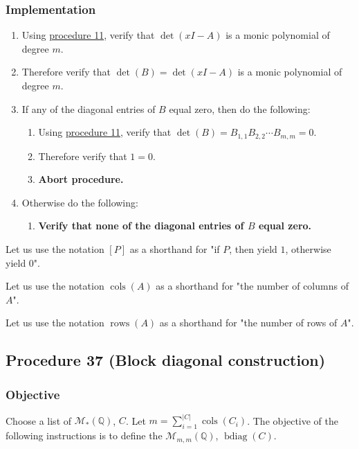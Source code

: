 \documentclass[twocolumn]{article}
\DeclareMathOperator{\bdiag}{bdiag}
\DeclareMathOperator{\cols}{cols}
\DeclareMathOperator{\rows}{rows}
\begin{document}
			\subsubsection{Implementation}
				\begin{enumerate}
					\item Using \hyperref[sec:procedure 11]{procedure 11}, verify that $\det(xI-A)$ is a monic polynomial of degree $m$.
					\item Therefore verify that $\det(B)=\det(xI-A)$ is a monic polynomial of degree $m$.
					\item If any of the diagonal entries of $B$ equal zero, then do the following:
					\begin{enumerate}
						\item Using \hyperref[sec:procedure 11]{procedure 11}, verify that $\det(B)=B_{1,1}B_{2,2}\cdots B_{m,m}=0$.
						\item Therefore verify that $1=0$.
						\item \textbf{Abort procedure.}
					\end{enumerate}
					\item Otherwise do the following:
					\begin{enumerate}
						\item \textbf{Verify that none of the diagonal entries of $B$ equal zero.}
					\end{enumerate}
				\end{enumerate}
			Let us use the notation $[P]$ as a shorthand for "if $P$, then yield $1$, otherwise yield $0$".
			
			Let us use the notation $\cols(A)$ as a shorthand for "the number of columns of $A$".
			
			Let us use the notation $\rows(A)$ as a shorthand for "the number of rows of $A$".
		\subsection{Procedure 37 (Block diagonal construction)}\label{sec:procedure 37}
			\subsubsection{Objective}
				Choose a list of $\mathcal{M}_{*}(\mathbb{Q})$, $C$. Let $m=\sum_{i=1}^{\lvert C\rvert}\cols(C_i)$. The objective of the following instructions is to define the $\mathcal{M}_{m,m}(\mathbb{Q})$, $\bdiag(C)$.
\end{document}
